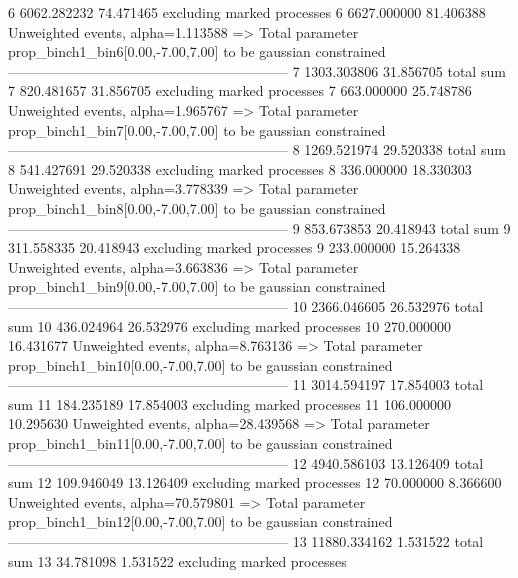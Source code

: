 6          6062.282232     74.471465       excluding marked processes    
6          6627.000000     81.406388       Unweighted events, alpha=1.113588
  => Total parameter prop_binch1_bin6[0.00,-7.00,7.00] to be gaussian constrained
------------------------------------------------------------
7          1303.303806     31.856705       total sum                     
7          820.481657      31.856705       excluding marked processes    
7          663.000000      25.748786       Unweighted events, alpha=1.965767
  => Total parameter prop_binch1_bin7[0.00,-7.00,7.00] to be gaussian constrained
------------------------------------------------------------
8          1269.521974     29.520338       total sum                     
8          541.427691      29.520338       excluding marked processes    
8          336.000000      18.330303       Unweighted events, alpha=3.778339
  => Total parameter prop_binch1_bin8[0.00,-7.00,7.00] to be gaussian constrained
------------------------------------------------------------
9          853.673853      20.418943       total sum                     
9          311.558335      20.418943       excluding marked processes    
9          233.000000      15.264338       Unweighted events, alpha=3.663836
  => Total parameter prop_binch1_bin9[0.00,-7.00,7.00] to be gaussian constrained
------------------------------------------------------------
10         2366.046605     26.532976       total sum                     
10         436.024964      26.532976       excluding marked processes    
10         270.000000      16.431677       Unweighted events, alpha=8.763136
  => Total parameter prop_binch1_bin10[0.00,-7.00,7.00] to be gaussian constrained
------------------------------------------------------------
11         3014.594197     17.854003       total sum                     
11         184.235189      17.854003       excluding marked processes    
11         106.000000      10.295630       Unweighted events, alpha=28.439568
  => Total parameter prop_binch1_bin11[0.00,-7.00,7.00] to be gaussian constrained
------------------------------------------------------------
12         4940.586103     13.126409       total sum                     
12         109.946049      13.126409       excluding marked processes    
12         70.000000       8.366600        Unweighted events, alpha=70.579801
  => Total parameter prop_binch1_bin12[0.00,-7.00,7.00] to be gaussian constrained
------------------------------------------------------------
13         11880.334162    1.531522        total sum                     
13         34.781098       1.531522        excluding marked processes    
